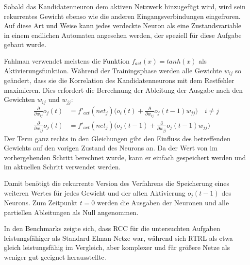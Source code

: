 Sobald das Kandidatenneuron dem aktiven Netzwerk hinzugefügt wird, wird sein rekurrentes Gewicht ebenso wie die anderen Eingangsverbindungen eingefroren. Auf diese Art und Weise kann jedes verdeckte Neuron als eine Zustandsvariable in einem endlichen Automaten angesehen werden, der speziell für diese Aufgabe gebaut wurde.

Fahlman verwendet meistens die Funktion $f_{act}(x) = tanh(x)$ als Aktivierungsfunktion.
Während der Trainingsphase werden alle Gewichte $w_{ij}$ so geändert, dass sie die Korrelation des Kandidatenneurons mit dem Restfehler maximieren. Dies erfordert die Berechnung der Ableitung der Ausgabe nach den Gewichten $w_{ij}$ und $w_{jj}$:
\begin{align*}
	\frac{\partial}{\partial w_{ij}} o_j(t) &= 
		f'_{act}(net_j) \Big( o_i(t) + 
			\frac{\partial}{\partial w_{ij}} o_j(t-1) w_{jj} \Big)
			\quad i \ne j \\
	\frac{\partial}{\partial w_{jj}} o_j(t) &= 
		f'_{act}(net_j) \Big( o_j(t-1) + 
			\frac{\partial}{\partial w_{jj}} o_j(t-1) w_{jj} \Big)	
\end{align*}
\noindent
Der Term ganz rechts in den Gleichungen gibt den Einfluss des betreffenden Gewichts auf den vorigen Zustand des Neurons an. Da der Wert von im vorhergehenden Schritt berechnet wurde, kann er einfach gespeichert werden und im aktuellen Schritt verwendet werden.

Damit benötigt die rekurrente Version des Verfahrens die Speicherung eines weiteren Wertes für jedes Gewicht und der alten Aktivierung $o_j(t-1)$ des Neurons. Zum Zeitpunkt $t=0$ werden die Ausgaben der Neuronen und alle partiellen Ableitungen als Null angenommen.

In den Benchmarks zeigte sich, dass RCC für die untersuchten Aufgaben leistungsfähiger als Standard-Elman-Netze war, während sich RTRL als etwa gleich leistungsfähig im Vergleich, aber komplexer und für größere Netze als weniger gut geeignet herausstellte.

